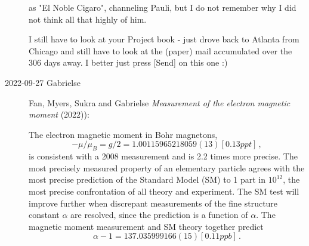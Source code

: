 \begin{description}
as "El Noble Cigaro", channeling Pauli, but I do not remember why I did not think all that highly of him.

I still have to look at your Project book - just drove back to Atlanta from Chicago and still have to look at the (paper) mail accumulated over the 306 days away. I better just press [Send] on this one :)



\item[2022-09-27 Gabrielse]
Fan, Myers, Sukra and Gabrielse
{\em Measurement of the electron magnetic moment} (2022)):

The electron magnetic moment in Bohr magnetons,
\[
-\mu/\mu_B=g/2=
1.00115965218059(13)[0.13ppt]
\,,
\]
is consistent with a 2008 measurement and is 2.2 times more
precise. The most precisely measured property of an elementary particle
agrees with the most precise prediction of the Standard Model (SM) to 1 part
in $10^12$, the most precise confrontation of all theory and experiment. The
SM test will improve further when discrepant measurements of the fine
structure constant $\alpha$ are resolved, since the prediction is a function
of $\alpha$. The magnetic moment measurement and SM theory together predict
\[
\alpha-1=137.035999166(15)[0.11ppb]
\,.
\]





\end{description}

